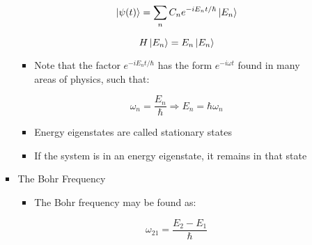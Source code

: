 \begin{itemize}
\begin{itemize}
\begin{itemize}
\begin{itemize}
                $$\ket{\psi(t)}=\sum_n C_ne^{-iE_nt/\hbar}\ket{E_n}$$

                $$H\ket{E_n}=E_n\ket{E_n}$$

              \item Note that the factor $e^{-iE_nt/\hbar}$ has the form $e^{-i\omega t}$ found in many areas of physics, such that:

                $$\omega_n=\frac{E_n}{\hbar}\Rightarrow E_n=\hbar \omega_n$$

              \item Energy eigenstates are called stationary states

              \item If the system is in an energy eigenstate, it remains in that state

            \end{itemize}

          \item The Bohr Frequency

            \begin{itemize}

              \item The Bohr frequency may be found as:

                $$\omega_{21}=\frac{E_2-E_1}{\hbar}$$

            \end{itemize}

        \end{itemize}

    \end{itemize}

\end{itemize}



